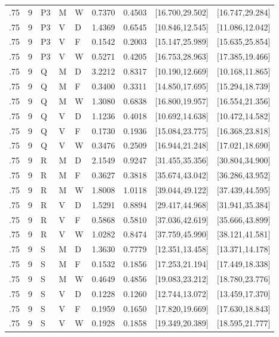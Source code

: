 {\begin{longtable}{rrlllrrll}
.75 & 9 & P3 & M & W & 0.7370 & 0.4503 & [16.700,29.502] & [16.747,29.284]\\
.75 & 9 & P3 & V & D & 1.4369 & 0.6545 & [10.846,12.545] & [11.086,12.042]\\
.75 & 9 & P3 & V & F & 0.1542 & 0.2003 & [15.147,25.989] & [15.635,25.854]\\
.75 & 9 & P3 & V & W & 0.5271 & 0.4205 & [16.753,28.963] & [17.385,19.466]\\
.75 & 9 & Q & M & D & 3.2212 & 0.8317 & [10.190,12.669] & [10.168,11.865]\\
.75 & 9 & Q & M & F & 0.3400 & 0.3311 & [14.850,17.695] & [15.294,18.739]\\
.75 & 9 & Q & M & W & 1.3080 & 0.6838 & [16.800,19.957] & [16.554,21.356]\\
.75 & 9 & Q & V & D & 1.1236 & 0.4018 & [10.692,14.638] & [10.472,14.582]\\
.75 & 9 & Q & V & F & 0.1730 & 0.1936 & [15.084,23.775] & [16.368,23.818]\\
.75 & 9 & Q & V & W & 0.3476 & 0.2509 & [16.944,21.248] & [17.021,18.690]\\
.75 & 9 & R & M & D & 2.1549 & 0.9247 & [31.455,35.356] & [30.804,34.900]\\
.75 & 9 & R & M & F & 0.3627 & 0.3818 & [35.674,43.042] & [36.286,43.952]\\
.75 & 9 & R & M & W & 1.8008 & 1.0118 & [39.044,49.122] & [37.439,44.595]\\
.75 & 9 & R & V & D & 1.5291 & 0.8894 & [29.417,44.968] & [31.941,35.384]\\
.75 & 9 & R & V & F & 0.5868 & 0.5810 & [37.036,42.619] & [35.666,43.899]\\
.75 & 9 & R & V & W & 1.0282 & 0.8474 & [37.759,45.990] & [38.121,41.581]\\
.75 & 9 & S & M & D & 1.3630 & 0.7779 & [12.351,13.458] & [13.371,14.178]\\
.75 & 9 & S & M & F & 0.1532 & 0.1856 & [17.253,21.194] & [17.449,18.338]\\
.75 & 9 & S & M & W & 0.4649 & 0.4856 & [19.083,23.212] & [18.780,23.776]\\
.75 & 9 & S & V & D & 0.1228 & 0.1260 & [12.744,13.072] & [13.459,17.370]\\
.75 & 9 & S & V & F & 0.1959 & 0.1650 & [17.820,19.669] & [17.630,18.843]\\
.75 & 9 & S & V & W & 0.1928 & 0.1858 & [19.349,20.389] & [18.595,21.777]\\
\end{longtable}}

